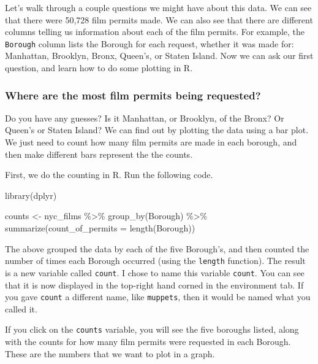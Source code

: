 \documentclass[
]{book}
\newenvironment{Shaded}{\begin{snugshade}}{\end{snugshade}}
\newcommand{\AttributeTok}[1]{\textcolor[rgb]{0.77,0.63,0.00}{#1}}
\newcommand{\FunctionTok}[1]{\textcolor[rgb]{0.00,0.00,0.00}{#1}}
\newcommand{\NormalTok}[1]{#1}
\newcommand{\OtherTok}[1]{\textcolor[rgb]{0.56,0.35,0.01}{#1}}
\newcommand{\SpecialCharTok}[1]{\textcolor[rgb]{0.00,0.00,0.00}{#1}}
\begin{document}
Let's walk through a couple questions we might have about this data. We can see that there were 50,728 film permits made. We can also see that there are different columns telling us information about each of the film permits. For example, the \texttt{Borough} column lists the Borough for each request, whether it was made for: Manhattan, Brooklyn, Bronx, Queen's, or Staten Island. Now we can ask our first question, and learn how to do some plotting in R.

\hypertarget{where-are-the-most-film-permits-being-requested}{%
\subsubsection{Where are the most film permits being requested?}\label{where-are-the-most-film-permits-being-requested}}

Do you have any guesses? Is it Manhattan, or Brooklyn, of the Bronx? Or Queen's or Staten Island? We can find out by plotting the data using a bar plot. We just need to count how many film permits are made in each borough, and then make different bars represent the the counts.

First, we do the counting in R. Run the following code.

\begin{Shaded}
\begin{Highlighting}[]
\FunctionTok{library}\NormalTok{(dplyr)}

\NormalTok{counts }\OtherTok{\textless{}{-}}\NormalTok{ nyc\_films }\SpecialCharTok{\%\textgreater{}\%}
          \FunctionTok{group\_by}\NormalTok{(Borough) }\SpecialCharTok{\%\textgreater{}\%}
          \FunctionTok{summarize}\NormalTok{(}\AttributeTok{count\_of\_permits =} \FunctionTok{length}\NormalTok{(Borough))}
\end{Highlighting}
\end{Shaded}

The above grouped the data by each of the five Borough's, and then counted the number of times each Borough occurred (using the \texttt{length} function). The result is a new variable called \texttt{count}. I chose to name this variable \texttt{count}. You can see that it is now displayed in the top-right hand corned in the environment tab. If you gave \texttt{count} a different name, like \texttt{muppets}, then it would be named what you called it.

If you click on the \texttt{counts} variable, you will see the five boroughs listed, along with the counts for how many film permits were requested in each Borough. These are the numbers that we want to plot in a graph.
\end{document}
